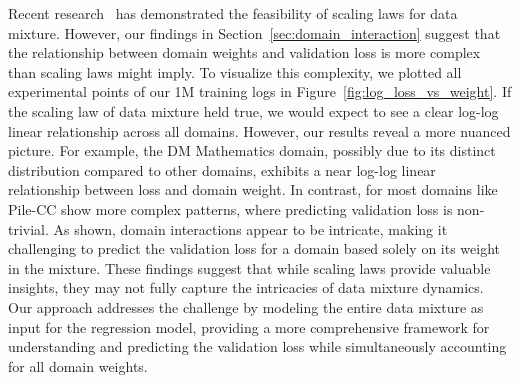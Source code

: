 Recent research~\citep{ye2024datamixing,ge2024data} has demonstrated the feasibility of scaling laws for data mixture.
However, our findings in Section~\ref{sec:domain_interaction} suggest that the relationship between domain weights and validation loss is more complex than scaling laws might imply.
To visualize this complexity, we plotted all experimental points of our 1M training logs in Figure~\ref{fig:log_loss_vs_weight}.
If the scaling law of data mixture held true, we would expect to see a clear log-log linear relationship across all domains.
However, our results reveal a more nuanced picture.
For example, the DM Mathematics domain, possibly due to its distinct distribution compared to other domains, exhibits a near log-log linear relationship between loss and domain weight.
In contrast, for most domains like Pile-CC show more complex patterns, where predicting validation loss is non-trivial.
As shown, domain interactions appear to be intricate, making it challenging to predict the validation loss for a domain based solely on its weight in the mixture.
These findings suggest that while scaling laws provide valuable insights, they may not fully capture the intricacies of data mixture dynamics.
Our approach addresses the challenge by modeling the entire data mixture as input for the regression model, providing a more comprehensive framework for understanding and predicting the validation loss while simultaneously accounting for all domain weights.
